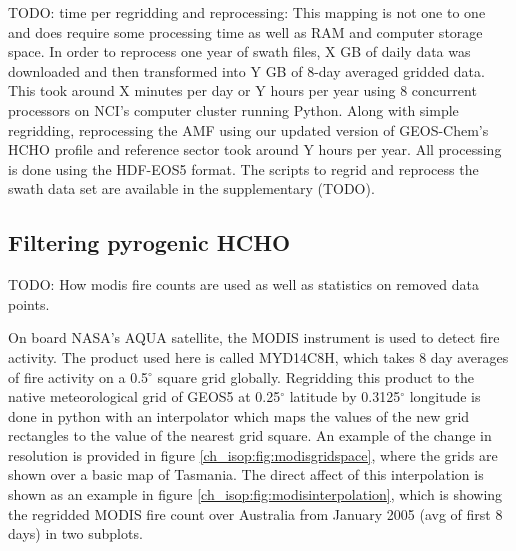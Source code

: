     
    TODO: time per regridding and reprocessing:
    This mapping is not one to one and does require some processing time as well as RAM and computer storage space.
    In order to reprocess one year of swath files, X GB of daily data was downloaded and then transformed into Y GB of 8-day averaged gridded data.
    This took around X minutes per day or Y hours per year using 8 concurrent processors on NCI's computer cluster running Python.
    Along with simple regridding, reprocessing the AMF using our updated version of GEOS-Chem's HCHO profile and reference sector took around Y hours per year.
    All processing is done using the HDF-EOS5 format.
    The scripts to regrid and reprocess the swath data set are available in the supplementary (TODO).
    
  \subsection{Filtering pyrogenic HCHO}
    TODO: How modis fire counts are used as well as statistics on removed data points.
    
    On board NASA's AQUA satellite, the MODIS instrument is used to detect fire activity.
    The product used here is called MYD14C8H, which takes 8 day averages of fire activity on a 0.5$^{\circ}$ square grid globally.
    Regridding this product to the native meteorological grid of GEOS5 at 0.25$^{\circ}$ latitude by 0.3125$^{\circ}$ longitude is done in python with an interpolator which maps the values of the new grid rectangles to the value of the nearest grid square.
    An example of the change in resolution is provided in figure \ref{ch_isop:fig:modisgridspace}, where the grids are shown over a basic map of Tasmania.
    The direct affect of this interpolation is shown as an example in figure \ref{ch_isop:fig:modisinterpolation}, which is showing the regridded MODIS fire count over Australia from January 2005 (avg of first 8 days) in two subplots.
    
